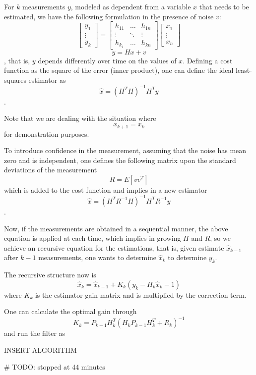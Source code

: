 For $k$ measurements $y$, modeled as dependent from a variable $x$ that needs to be estimated, we have the following formulation in the presence of noise $v$: \[
    \begin{bmatrix} y_1\\ \vdots\\ y_k \end{bmatrix}=\begin{bmatrix} h_{11} & \ldots & h_{1n} \\ \vdots & \ddots & \vdots \\ h_{k_1} & \ldots & h_{kn} \end{bmatrix} \begin{bmatrix} x_1\\ \vdots\\ x_n \end{bmatrix}
\] \[
y=Hx+v
\], that is, $y$ depends differently over time on the values of $x$. Defining a cost function as the square of the error (inner product), one can define the ideal least-squares estimator as \[
\hat{x}=\left( H^{T}H \right) ^{-1}H^{T}y
\] .

Note that we are dealing with the situation where \[
x_{k+1} = x_k
\] for demonstration purposes.

To introduce confidence in the measurement, assuming that the noise has mean zero and is independent, one defines the following matrix upon the standard deviations of the measurement \[
R = E\left[ vv^{T} \right] 
\] which is added to the cost function and implies in a new estimator \[
\hat{x}=\left( H^{T}R^{-1}H \right) ^{-1}H^{T}R^{-1}y
\] .

Now, if the measurements are obtained in a sequential manner, the above equation is applied at each time, which implies in growing $H$ and $R$, so we achieve an recursive equation for the estimations, that is, given estimate $\hat{x}_{k-1}$ after $k-1$ measurements, one wants to determine $\hat{x}_k$ to determine $y_k$.

The recursive structure now is \[
    \hat{x}_k=\hat{x}_{k-1}+K_k\left( y_k-H_k\hat{x}_k-1 \right) 
\] where $K_k$ is the estimator gain matrix and is multiplied by the correction term.

One can calculate the optimal gain through \[
    K_k=P_{k-1}H_k^{T}\left( H_kP_{k-1}H_k^{T}+R_k \right) ^{-1}
\] and run the filter as

INSERT ALGORITHM

# TODO: stopped at 44 minutes
